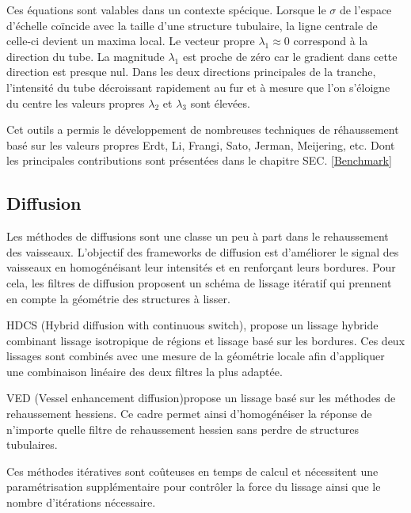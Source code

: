 Ces équations sont valables dans un contexte spécique. Lorsque le $\sigma$ de l'espace d'échelle coïncide avec la taille d'une structure tubulaire, la ligne centrale de celle-ci devient un maxima local. Le vecteur propre $\lambda_1 \approx 0$ correspond à la direction du tube. La magnitude $\lambda_1$ est proche de zéro car le gradient dans cette direction est presque nul. Dans les deux directions principales de la tranche, l'intensité du tube décroissant rapidement au fur et à mesure que l'on s'éloigne du centre les valeurs propres $\lambda_2$ et $\lambda_3$ sont élevées.

Cet outils a permis le développement de nombreuses techniques de réhaussement basé sur les valeurs propres Erdt, Li, Frangi, Sato, Jerman, Meijering, etc. Dont les principales contributions sont présentées dans le chapitre SEC. \ref{Benchmark}
 

\subsection{Diffusion}
\label{sec:EA:rehaussement:diffusion}

Les méthodes de diffusions sont une classe un peu à part dans le rehaussement des vaisseaux. L'objectif des frameworks de diffusion est d'améliorer le signal des vaisseaux en homogénéisant leur intensités et en renforçant leurs bordures. Pour cela, les filtres de diffusion proposent un schéma de lissage itératif qui prennent en compte la géométrie des structures à lisser.

HDCS \cite{Mendrik2009_HDCS} (Hybrid diffusion with continuous switch), propose un lissage hybride combinant lissage isotropique de régions et lissage basé sur les bordures. Ces deux lissages sont combinés avec une mesure de la géométrie locale afin d'appliquer une combinaison linéaire des deux filtres la plus adaptée.

VED \cite{Manniesing2006_VED} (Vessel enhancement diffusion)propose un lissage basé sur les méthodes de rehaussement hessiens. Ce cadre permet ainsi d'homogénéiser la réponse de n'importe quelle filtre de rehaussement hessien sans perdre de structures tubulaires.

Ces méthodes itératives sont coûteuses en temps de calcul et nécessitent une paramétrisation supplémentaire pour contrôler la force du lissage ainsi que le nombre d'itérations nécessaire.

